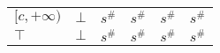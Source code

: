 \documentclass{article}
\begin{document}
\begin{landscape}
\begin{table}
{\begin{tabular}{|l|l|ll|ll|ll|l|}
    \multirow{3}{*}{$[c, +\infty)$} & \multirow{3}{*}{$\bot$} & \multicolumn{2}{l|}{\multirow{3}{*}{$s^\#$}}                                       & \multicolumn{2}{l|}{\multirow{3}{*}{$s^\#$}}             & \multicolumn{2}{l|}{\multirow{3}{*}{$s^\#$}}                                       & \multirow{3}{*}{$s^\#$} \\
                                    &                         & \multicolumn{2}{l|}{}                                                              & \multicolumn{2}{l|}{}                                    & \multicolumn{2}{l|}{}                                                              &                         \\
                                    &                         & \multicolumn{2}{l|}{}                                                              & \multicolumn{2}{l|}{}                                    & \multicolumn{2}{l|}{}                                                              &                         \\ \hline
    $\top$                          & $\bot$                  & \multicolumn{2}{l|}{$s^\#$}                                                        & \multicolumn{2}{l|}{$s^\#$}                              & \multicolumn{2}{l|}{$s^\#$}                                                        & $s^\#$                  \\ \hline
    \end{tabular}
    }
    \end{table}

\end{landscape}
\end{document}
